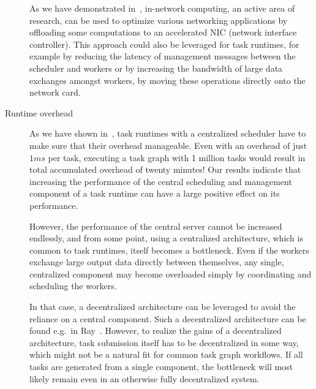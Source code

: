 \begin{description}
    As we have demonstrated in~\cite{spin, spin2}, in-network computing, an active area of
    research, can be used to optimize various networking applications by offloading some
    computations to an accelerated NIC (network interface controller). This approach could also
    be leveraged for task runtimes, for example by reducing the latency of management messages
    between the scheduler and workers or by increasing the bandwidth of large data exchanges
    amongst workers, by moving these operations directly onto the network card.
    \item[Runtime overhead] As we have shown in~\cite{rsds}, task runtimes with a centralized
    scheduler have to make sure that their overhead manageable. Even with an overhead of just $1ms$
    per task, executing a task graph with 1 million tasks would result in total accumulated
    overhead of twenty minutes! Our results indicate that increasing the performance of the
    central scheduling and management component of a task runtime can have a large positive
    effect on its performance.

    However, the performance of the central server cannot be increased
    endlessly, and from some point, using a centralized architecture, which is common to task
    runtimes, itself becomes a bottleneck. Even if the workers exchange large output data
    directly between themselves, any single, centralized component may become overloaded simply
    by coordinating and scheduling the workers.

    In that case, a decentralized architecture can be leveraged to avoid the reliance on a
    central component. Such a decentralized architecture can be found e.g.\ in Ray~\cite{ray}.
    However, to realize the gains of a decentralized architecture, task submission itself has to
    be decentralized in some way, which might not be a natural fit for common task graph workflows.
    If all tasks are generated from a single component, the bottleneck will most likely remain
    even in an otherwise fully decentralized system.
\end{description}

